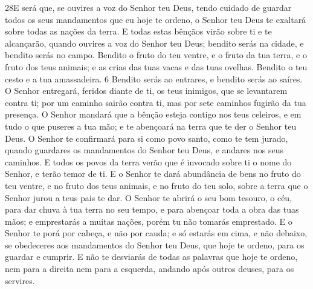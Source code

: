 \lettrine{28} E será que, se ouvires a voz do Senhor teu Deus,
tendo cuidado de guardar todos os seus mandamentos que eu hoje te
ordeno, o Senhor teu Deus te exaltará sobre todas as nações da
terra. E todas estas bênçãos virão sobre ti e te alcançarão,
quando ouvires a voz do Senhor teu Deus; bendito serás na
cidade, e bendito serás no campo. Bendito o fruto do teu ventre,
e o fruto da tua terra, e o fruto dos teus animais; e as crias das
tuas vacas e das tuas ovelhas. Bendito o teu cesto e a tua
amassadeira. 6 Bendito serás ao entrares, e bendito serás ao saíres.
O Senhor entregará, feridos diante de ti, os teus inimigos, que
se levantarem contra ti; por um caminho sairão contra ti, mas por
sete caminhos fugirão da tua presença. O Senhor mandará que a
bênção esteja contigo nos teus celeiros, e em tudo o que puseres a
tua mão; e te abençoará na terra que te der o Senhor teu Deus. O
Senhor te confirmará para si como povo santo, como te tem jurado,
quando guardares os mandamentos do Senhor teu Deus, e andares nos
seus caminhos. E todos os povos da terra verão que é invocado
sobre ti o nome do Senhor, e terão temor de ti. E o Senhor te
dará abundância de bens no fruto do teu ventre, e no fruto dos teus
animais, e no fruto do teu solo, sobre a terra que o Senhor jurou a
teus pais te dar. O Senhor te abrirá o seu bom tesouro, o
céu, para dar chuva à tua terra no seu tempo, e para abençoar toda a
obra das tuas mãos; e emprestarás a muitas nações, porém tu não
tomarás emprestado. E o Senhor te porá por cabeça, e não por
cauda; e só estarás em cima, e não debaixo, se obedeceres aos
mandamentos do Senhor teu Deus, que hoje te ordeno, para os guardar
e cumprir. E não te desviarás de todas as palavras que hoje
te ordeno, nem para a direita nem para a esquerda, andando após
outros deuses, para os servires.

